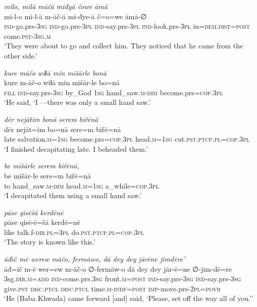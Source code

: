 \ea \label{BP.80}
\textit{milo, milā māčā miđyā čowe āmā} \\ 
\gll mi-l-o mi-l-ā m-āč-ā mi-đye-ā č=o=we āmā-∅ \\ 
 \textsc{ind-}go.prs\textsc{-3sg} \textsc{ind-}go.prs\textsc{-3pl} \textsc{ind-}say.prs\textsc{-3pl} \textsc{ind-}look.prs\textsc{-3pl} in=\textsc{dem.dist}\textsc{=\textsc{post}} come\textsc{.pst}\textsc{-3sg}\textsc{.m} \\ 
\glt `They were about to go and collect him. They noticed that he came from the other side.'
\z 
 
\ea \label{BP.82}
\textit{kure māčo wiɫā min mišārle bonā} \\ 
\gll kure m-āč-o wiɫā min mišār-le bo=nā \\ 
 \textsc{fill} \textsc{ind-}say.prs\textsc{-3sg} by\_God \textsc{1sg} hand\_saw\textsc{.m}\textsc{-dim} become.prs\textsc{=cop}\textsc{.3pl} \\ 
\glt `He said, ‘I —there was only a small hand saw.'
\z 
 
\ea \label{BP.83}
\textit{dēr nejātim bonā serem biřēnā} \\ 
\gll dēr nejāt=im bo=nā sere=m biřē=nā \\ 
 late salvation\textsc{.m}\textsc{=\textsc{1sg}} become.prs\textsc{=cop}\textsc{.3pl} head\textsc{.m}\textsc{=\textsc{1sg}} cut\textsc{.pst}\textsc{.ptcp}\textsc{.pl}\textsc{=cop}\textsc{.3pl} \\ 
\glt `I finished decapitating late. I beheaded them.'
\z 
 
\ea \label{BP.84}
\textit{be mišārle serem biřēnā,} \\ 
\gll be mišār-le sere=m biřē=nā \\ 
 to hand\_saw\textsc{.m}\textsc{-dim} head\textsc{.m}\textsc{=\textsc{1sg}} a\_while\textsc{=cop}\textsc{.3pl} \\ 
\glt `I decapitated them using a small hand saw.'
\z 
 
\ea \label{BP.85}
\textit{pāse qisēšā kerdēnē} \\ 
\gll pāse qisē-ē=šā kerdē=nē \\ 
 like talk.f\textsc{-dir}\textsc{.pl}\textsc{=3pl} do\textsc{.pst}\textsc{.ptcp}\textsc{.pl}\textsc{=cop}\textsc{.3pl} \\ 
\glt `The story is known like this.'
\z 
 
\ea \label{BP.86}
\textit{āđīč mē werew māčo, fermāwo, dā dey dey jārēne jimdēre’} \\ 
\gll āđ=īč m-ē wer=ew m-āč-o ∅-fermāw-o dā dey dey jār-ē=ne ∅-jim-dē=re \\ 
 3sg\textsc{.dir}\textsc{.m}\textsc{=add} \textsc{ind-}come.prs\textsc{.3sg} front\textsc{.m}\textsc{=\textsc{post}} \textsc{ind-}say.prs\textsc{-3sg} \textsc{ind-}say.prs\textsc{-3sg} give\textsc{.pst} \textsc{disc.ptcl} \textsc{disc.ptcl} time\textsc{.m}\textsc{-indf}\textsc{=\textsc{post}} \textsc{imp-}move.prs-\textsc{2pl}\textsc{=\textsc{povb}} \\ 
\glt `He (Baba Khwada) came forward [and] said, ‘Please, set off the way all of you.’'
\z 
 
